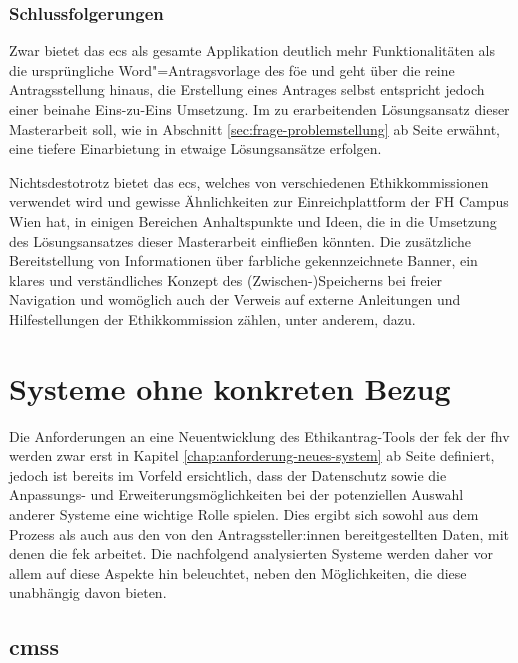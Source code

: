 \documentclass[a4paper,12pt,twoside]{scrreprt}
\begin{document}
\subsubsection*{Schlussfolgerungen}
\label{sub-sub-sec:schlussfolgerungen-ecs}

Zwar bietet das \acl{ecs} als gesamte Applikation deutlich mehr Funktionalitäten als die ursprüngliche Word"=Antragsvorlage des \ac{föe} und geht über die reine Antragsstellung hinaus, die Erstellung eines Antrages selbst entspricht jedoch einer beinahe Eins-zu-Eins Umsetzung. Im zu erarbeitenden Lösungsansatz dieser Masterarbeit soll, wie in Abschnitt \ref{sec:frage-problemstellung} ab Seite \pageref{sec:frage-problemstellung} erwähnt, eine tiefere Einarbietung in etwaige Lösungsansätze erfolgen.

Nichtsdestotrotz bietet das \ac{ecs}, welches von verschiedenen Ethikkommissionen verwendet wird und gewisse Ähnlichkeiten zur Einreichplattform der FH Campus Wien hat, in einigen Bereichen Anhaltspunkte und Ideen, die in die Umsetzung des Lösungsansatzes dieser Masterarbeit einfließen könnten. Die zusätzliche Bereitstellung von Informationen über farbliche gekennzeichnete Banner, ein klares und verständliches Konzept des (Zwischen-)Speicherns bei freier Navigation und womöglich auch der Verweis auf externe Anleitungen und Hilfestellungen der Ethikkommission zählen, unter anderem, dazu.

\section{Systeme ohne konkreten Bezug}
\label{sec:systeme-ohne-bezug}

Die Anforderungen an eine Neuentwicklung des Ethikantrag-Tools der \ac{fek} der \ac{fhv} werden zwar erst in Kapitel \ref{chap:anforderung-neues-system} ab Seite \pageref{chap:anforderung-neues-system} definiert, jedoch ist bereits im Vorfeld ersichtlich, dass der Datenschutz sowie die Anpassungs- und Erweiterungsmöglichkeiten bei der potenziellen Auswahl anderer Systeme eine wichtige Rolle spielen. Dies ergibt sich sowohl aus dem Prozess als auch aus den von den Antragssteller:innen bereitgestellten Daten, mit denen die \acl{fek} arbeitet. Die nachfolgend analysierten Systeme werden daher vor allem auf diese Aspekte hin beleuchtet, neben den Möglichkeiten, die diese unabhängig davon bieten.

\subsection{\aclp{cms}}
\label{sub-sec:cms-syteme}
\end{document}

